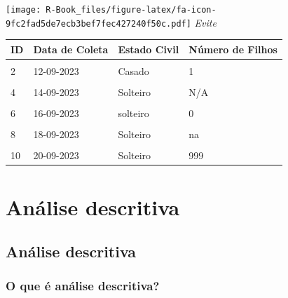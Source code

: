 \documentclass[
]{book}
\begin{document}
\texttt{[image: R-Book\_files/figure-latex/fa-icon-9fc2fad5de7ecb3bef7fec427240f50c.pdf]} \emph{Evite}

\begin{tabu} to 
\toprule
\textbf{ID} & \textbf{Data de Coleta} & \textbf{Estado Civil} & \textbf{Número de Filhos}\\
\midrule
{} &  &  & \\
2 & 12-09-2023 & Casado & 1\\
 &  &  & \\
4 & 14-09-2023 & Solteiro & N/A\\
 &  &  & \\
6 & 16-09-2023 & solteiro & 0\\
 &  &  & \\
8 & 18-09-2023 & Solteiro & na\\
 &  &  & \\
10 & 20-09-2023 & Solteiro & 999\\
\bottomrule
\end{tabu}

\hypertarget{analise-descritiva}{%
\chapter{\texorpdfstring{\textbf{Análise descritiva}}{Análise descritiva}}\label{analise-descritiva}}

\hypertarget{descritiva}{%
\section{Análise descritiva}\label{descritiva}}

\hypertarget{o-que-uxe9-anuxe1lise-descritiva}{%
\subsection{O que é análise descritiva?}\label{o-que-uxe9-anuxe1lise-descritiva}}
\end{document}

